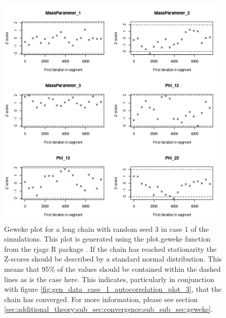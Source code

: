 \documentclass[14pt]{extarticle} %
\begin{document}
	\begin{figure}[!htb]
		\centering
		\includegraphics[scale=0.65]{Images/Gen_data/Case_1/Geweke_plot_3.png}
		\caption{Geweke plot \citep{GewekeEvaluatingAccuracySamplingBased} for a long chain with random seed 3 in case 1 of the simulations. 	This plot is generated using the plot.geweke function from the rjags R package \citep{PlummerRjags2018}. If the chain has reached stationarity the Z-scores should be described by a standard normal distribution. This means that 95\% of the  values should be contained within the dashed lines as is the case here. This indicates, particularly in conjunction with figure \ref{fig:gen_data_case_1_autocorrelation_plot_3}, that the chain has converged. For more information, please see section \ref{sec:additional_theory:sub_sec:convergence:sub_sub_sec:geweke}.}
			
		\label{fig:gen_data_case_1_geweke_plot_3}
	\end{figure}
		
\end{document}
